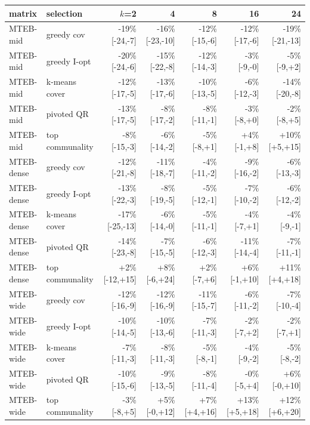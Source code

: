 \begin{tabular}{llrrrrr}\toprule
matrix & selection & $k$=2 & 4 & 8 & 16 & 24 \\\midrule
MTEB-mid & greedy cov & -19\% \scriptsize[-24,-7] & -16\% \scriptsize[-23,-10] & -12\% \scriptsize[-15,-6] & -12\% \scriptsize[-17,-6] & -19\% \scriptsize[-21,-13] \\
MTEB-mid & greedy I-opt & -20\% \scriptsize[-24,-6] & -15\% \scriptsize[-22,-8] & -12\% \scriptsize[-14,-3] & -3\% \scriptsize[-9,-0] & -5\% \scriptsize[-9,+2] \\
MTEB-mid & k-means cover & -12\% \scriptsize[-17,-5] & -13\% \scriptsize[-17,-6] & -10\% \scriptsize[-13,-5] & -6\% \scriptsize[-12,-3] & -14\% \scriptsize[-20,-8] \\
MTEB-mid & pivoted QR & -13\% \scriptsize[-17,-5] & -8\% \scriptsize[-17,-2] & -8\% \scriptsize[-11,-1] & -3\% \scriptsize[-8,+0] & -2\% \scriptsize[-8,+5] \\
MTEB-mid & top communality & -8\% \scriptsize[-15,-3] & -6\% \scriptsize[-14,-2] & -5\% \scriptsize[-8,+1] & +4\% \scriptsize[-1,+8] & +10\% \scriptsize[+5,+15] \\
MTEB-dense & greedy cov & -12\% \scriptsize[-21,-8] & -11\% \scriptsize[-18,-7] & -4\% \scriptsize[-11,-2] & -9\% \scriptsize[-16,-2] & -6\% \scriptsize[-13,-3] \\
MTEB-dense & greedy I-opt & -13\% \scriptsize[-22,-3] & -8\% \scriptsize[-19,-5] & -5\% \scriptsize[-12,-1] & -7\% \scriptsize[-10,-2] & -6\% \scriptsize[-12,-2] \\
MTEB-dense & k-means cover & -17\% \scriptsize[-25,-13] & -6\% \scriptsize[-14,-0] & -5\% \scriptsize[-11,-1] & -4\% \scriptsize[-7,+1] & -4\% \scriptsize[-9,-1] \\
MTEB-dense & pivoted QR & -14\% \scriptsize[-23,-8] & -7\% \scriptsize[-15,-5] & -6\% \scriptsize[-12,-3] & -11\% \scriptsize[-14,-4] & -7\% \scriptsize[-11,-1] \\
MTEB-dense & top communality & +2\% \scriptsize[-12,+15] & +8\% \scriptsize[-6,+24] & +2\% \scriptsize[-7,+6] & +6\% \scriptsize[-1,+10] & +11\% \scriptsize[+4,+18] \\
MTEB-wide & greedy cov & -12\% \scriptsize[-16,-9] & -12\% \scriptsize[-16,-9] & -11\% \scriptsize[-15,-7] & -6\% \scriptsize[-11,-2] & -7\% \scriptsize[-10,-4] \\
MTEB-wide & greedy I-opt & -10\% \scriptsize[-14,-5] & -10\% \scriptsize[-13,-6] & -7\% \scriptsize[-11,-3] & -2\% \scriptsize[-7,+2] & -2\% \scriptsize[-7,+1] \\
MTEB-wide & k-means cover & -7\% \scriptsize[-11,-3] & -8\% \scriptsize[-11,-3] & -5\% \scriptsize[-8,-1] & -4\% \scriptsize[-9,-2] & -5\% \scriptsize[-8,-2] \\
MTEB-wide & pivoted QR & -10\% \scriptsize[-15,-6] & -9\% \scriptsize[-13,-5] & -8\% \scriptsize[-11,-4] & -0\% \scriptsize[-5,+4] & +6\% \scriptsize[-0,+10] \\
MTEB-wide & top communality & -3\% \scriptsize[-8,+5] & +5\% \scriptsize[-0,+12] & +7\% \scriptsize[+4,+16] & +13\% \scriptsize[+5,+18] & +12\% \scriptsize[+6,+20] \\
\bottomrule\end{tabular}
